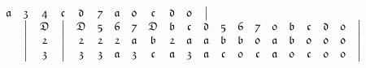 \documentclass[final,12pt,a4paper,twoside,fleqn]{extbook}
\theoremstyle{definition}
\theoremstyle{remark}
\begin{document}
\begin{equation}
\begin{array}{@{}*{22}c@{}}
      {\mathfrak{a}} &%
      {\mathfrak{3}} &%
      {\mathfrak{4}} &%
      {\mathfrak{c}} &%
      {\mathfrak{d}} &%
      {\mathfrak{7}} &%
      {\mathfrak{a}} &%
      {\mathfrak{0}} &%
      {\mathfrak{c}} &%
      {\mathfrak{d}} &%
      {\mathfrak{0}} &%
      \big\vert       %
      \\ \nonumber
      {}             &%
      \big\vert      &%
      {\mathfrak{D}} &%
      \big\vert      &%
      {\mathfrak{D}} &%
      {\mathfrak{5}} &%
      {\mathfrak{6}} &%
      {\mathfrak{7}} &%
      {\mathfrak{D}} &%
      {\mathfrak{b}} &%
      {\mathfrak{c}} &%
      {\mathfrak{d}} &%
      {\mathfrak{5}} &%
      {\mathfrak{6}} &%
      {\mathfrak{7}} &%
      {\mathfrak{0}} &%
      {\mathfrak{b}} &%
      {\mathfrak{c}} &%
      {\mathfrak{d}} &%
      {\mathfrak{0}} &%
      \big\vert       %
      \\ \nonumber
      {}             &%
      \big\vert      &%
      {\mathfrak{2}} &%
      \big\vert      &%
      {\mathfrak{2}} &%
      {\mathfrak{2}} &%
      {\mathfrak{2}} &%
      {\mathfrak{a}} &%
      {\mathfrak{b}} &%
      {\mathfrak{2}} &%
      {\mathfrak{a}} &%
      {\mathfrak{a}} &%
      {\mathfrak{b}} &%
      {\mathfrak{b}} &%
      {\mathfrak{0}} &%
      {\mathfrak{a}} &%
      {\mathfrak{b}} &%
      {\mathfrak{0}} &%
      {\mathfrak{0}} &%
      {\mathfrak{0}} &%
      \big\vert       %
      \\ \nonumber
      {}             &%
      \big\vert      &%
      {\mathfrak{3}} &%
      \big\vert      &%
      {\mathfrak{3}} &%
      {\mathfrak{3}} &%
      {\mathfrak{a}} &%
      {\mathfrak{3}} &%
      {\mathfrak{c}} &%
      {\mathfrak{a}} &%
      {\mathfrak{3}} &%
      {\mathfrak{a}} &%
      {\mathfrak{c}} &%
      {\mathfrak{0}} &%
      {\mathfrak{c}} &%
      {\mathfrak{a}} &%
      {\mathfrak{0}} &%
      {\mathfrak{c}} &%
      {\mathfrak{0}} &%
      {\mathfrak{0}} &%
      \big\vert       %

\end{array}
\end{equation}
\end{document}
